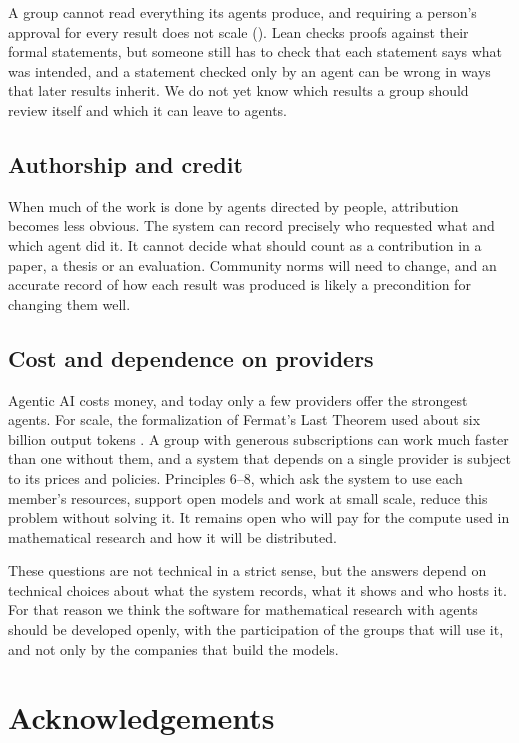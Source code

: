 \documentclass{article}
\begin{document}
A group cannot read everything its agents produce, and requiring a person's approval for every result does not scale (). Lean checks proofs against their formal statements, but someone still has to check that each statement says what was intended, and a statement checked only by an agent can be wrong in ways that later results inherit. We do not yet know which results a group should review itself and which it can leave to agents.

\subsection*{Authorship and credit}

When much of the work is done by agents directed by people, attribution becomes less obvious. The system can record precisely who requested what and which agent did it. It cannot decide what should count as a contribution in a paper, a thesis or an evaluation. Community norms will need to change, and an accurate record of how each result was produced is likely a precondition for changing them well.

\subsection*{Cost and dependence on providers}

Agentic AI costs money, and today only a few providers offer the strongest agents. For scale, the formalization of Fermat's Last Theorem used about six billion output tokens \cite{anthropic2026flt}. A group with generous subscriptions can work much faster than one without them, and a system that depends on a single provider is subject to its prices and policies. Principles 6--8, which ask the system to use each member's resources, support open models and work at small scale, reduce this problem without solving it. It remains open who will pay for the compute used in mathematical research and how it will be distributed.

These questions are not technical in a strict sense, but the answers depend on technical choices about what the system records, what it shows and who hosts it. For that reason we think the software for mathematical research with agents should be developed openly, with the participation of the groups that will use it, and not only by the companies that build the models.

\section*{Acknowledgements}
\end{document}
